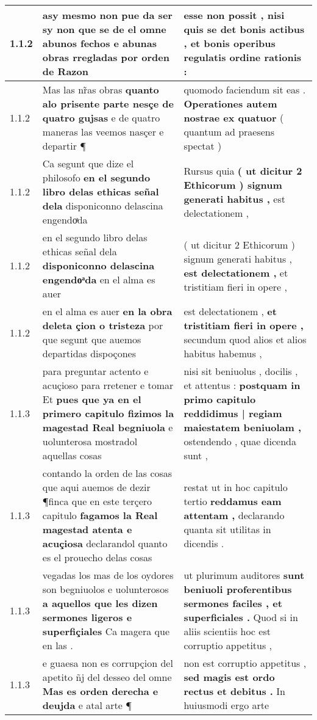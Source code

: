 \begin{tabular}{|p{1cm}|p{6.5cm}|p{6.5cm}|}
1.1.2 & asy mesmo non pue da ser \textbf{ sy non que se de el omne abunos fechos e abunas obras rregladas } por orden de Razon & esse non possit , \textbf{ nisi quis se det bonis actibus , } et bonis operibus regulatis ordine rationis : \\\hline
1.1.2 & Mas las nr̃as obras \textbf{ quanto alo prisente parte nesçe de quatro gujsas } e de quatro maneras las veemos nasçer e departir ¶ & quomodo faciendum sit eas . \textbf{ Operationes autem nostrae ex quatuor } ( quantum ad praesens spectat ) \\\hline
1.1.2 & Ca segunt que dize el philosofo \textbf{ en el segundo libro delas ethicas señal dela } disponiconno delascina engendoͣda & Rursus quia \textbf{ ( ut dicitur 2 Ethicorum ) signum generati habitus , } est delectationem , \\\hline
1.1.2 & en el segundo libro delas ethicas señal dela \textbf{ disponiconno delascina engendoͣda } en el alma es auer & ( ut dicitur 2 Ethicorum ) signum generati habitus , \textbf{ est delectationem , } et tristitiam fieri in opere , \\\hline
1.1.2 & en el alma es auer \textbf{ en la obra deleta çion o tristeza } por que segunt que auemos departidas dispoçones & est delectationem , \textbf{ et tristitiam fieri in opere , } secundum quod alios et alios habitus habemus , \\\hline
1.1.3 & para preguntar actento e acuçioso para rretener e tomar Et \textbf{ pues que ya en el primero capitulo fizimos la magestad Real begniuola } e uolunterosa mostradol aquellas cosas & nisi sit beniuolus , docilis , et attentus : \textbf{ postquam in primo capitulo reddidimus | regiam maiestatem beniuolam , } ostendendo , quae dicenda sunt , \\\hline
1.1.3 & contando la orden de las cosas que aqui auemos de dezir ¶finca que en este terçero capitulo \textbf{ fagamos la Real magestad atenta e acuçiosa } declarandol quanto es el prouecho delas cosas & restat ut in hoc capitulo tertio \textbf{ reddamus eam attentam , } declarando quanta sit utilitas in dicendis . \\\hline
1.1.3 & vegadas los mas de los oydores son begniuolos e uolunterosos \textbf{ a aquellos que les dizen sermones ligeros e superfiçiales } Ca magera que en las . & ut plurimum auditores \textbf{ sunt beniuoli proferentibus sermones faciles , et superficiales . } Quod si in aliis scientiis hoc est corruptio appetitus , \\\hline
1.1.3 & e guaesa non es corrupçion del apetito ñj del desseo del omne \textbf{ Mas es orden derecha e deujda } e atal arte ¶ & non est corruptio appetitus , \textbf{ sed magis est ordo rectus et debitus . } In huiusmodi ergo arte \\\hline

\end{tabular}
